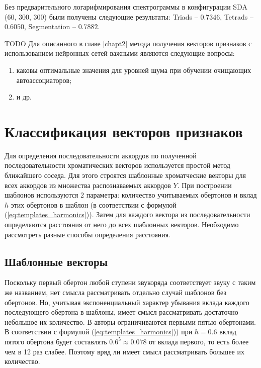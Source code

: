 Без предварительного логарифмирования спектрограммы в конфигурации SDA (60,
300, 300) были получены следующие результаты: Triads -- $0.7346$, Tetrads --
$0.6050$, Segmentation -- $0.7882$.

TODO Для описанного в главе \ref{chapt2} метода получения векторов признаков с
использованием нейронных сетей важными являются следующие вопросы:
\begin{enumerate}
  \item каковы оптимальные значения для уровней шума при обучении очищающих
  автоассоциаторов;
  \item и др.
\end{enumerate}

\section{Классификация векторов признаков} \label{sect3_class}

Для определения последовательности аккордов по полученной последовательности
хроматических векторов используется простой метод ближайшего соседа. Для этого
строятся шаблонные хроматческие векторы для всех аккордов из множества
распознаваемых аккордов $Y$. При построении шаблонов используются 2 параметра:
количество учитываемых обертонов и вклад $h$ этих обертонов в шаблон (в
соответствии с формулой (\ref{eq:templates_harmonics})). Затем для каждого
вектора из последовательности определяются расстояния от него до всех шаблонных
векторов. Необходимо рассмотреть разные способы определения расстояния.

\subsection{Шаблонные векторы} \label{ssect3_templates}

Поскольку первый обертон любой ступени звукоряда соответствует звуку с таким же
названием, нет смысла рассматривать отдельно случай шаблонов без обертонов. Но,
учитывая экспоненциальный характер убывания вклада каждого последующего обертона
в шаблоны, имеет смысл рассматривать достаточно небольшое их количество. В
\cite{Oudre2009} авторы ограничиваются первыми пятью обертонами. В соответствии
с формулой (\ref{eq:templates_harmonics})) при $h=0.6$ вклад пятого обертона
будет составлять $0.6^5 \approx 0.078$ от вклада первого, то есть более чем в 12
раз слабее. Поэтому вряд ли имеет смысл рассматривать большее их количество.

